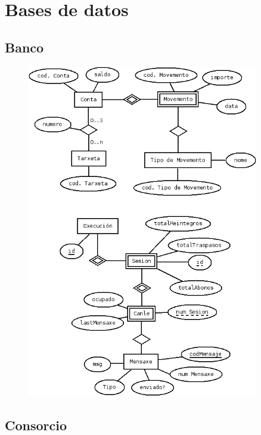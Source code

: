 \documentclass[a4paper,titlepage]{article}
\begin{document}
\section {Bases de datos}
\subsection {Banco}

\begin{figure}[h!]
  \begin{center}
    \includegraphics[width=0.9\textwidth]{diagrama_bd_bancos.png}
  \end{center}
\end{figure}



\clearpage

\subsection {Consorcio}
\end{document}
